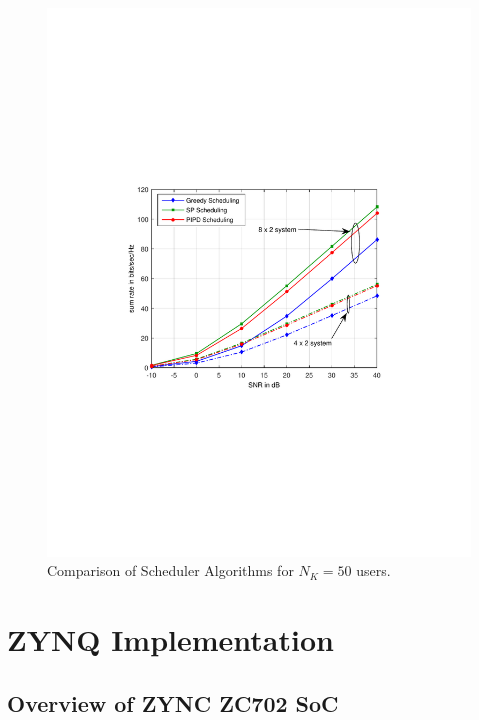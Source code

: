 \documentclass[11pt]{beamer}
\begin{document}
\begin{frame}
\begin{figure}
	\centering
	\caption{Comparison of Scheduler Algorithms for $N_K = 50$ users.}
	\includegraphics[trim=1.5in 3.5in 1.5in 3.5in,width=0.8\columnwidth]{sra_50_users}

\end{figure}
\end{frame}

\section{ZYNQ Implementation}

\subsection{Overview of ZYNC ZC702 SoC}
\end{document}

